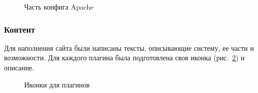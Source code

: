 \begin{figure}[h!]
\center{\texttt{[image: lo6]}}
\caption{ Часть конфига Apache }
\label{lo6:lo6}
\end{figure}

\subsubsection{ Контент }

Для наполнения сайта были написаны тексты, описывающие систему, ее части и возможности. Для каждого плагина была подготовлена своя иконка (рис.~\ref{lo7:lo7}) и описание.

\begin{figure}[h!]
\center{\texttt{[image: lo7]}}
\caption{ Иконки для плагинов }
\label{lo7:lo7}
\end{figure}

\clearpage








